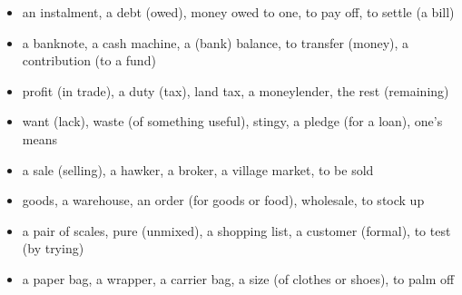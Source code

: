 \begin{itemize}
\raggedright
  \item an instalment, a debt (owed), money owed to one, to pay off, to settle (a bill)
  \item a banknote, a cash machine, a (bank) balance, to transfer (money), a contribution (to a fund)
  \item profit (in trade), a duty (tax), land tax, a moneylender, the rest (remaining)
  \item want (lack), waste (of something useful), stingy, a pledge (for a loan), one's means
  \item a sale (selling), a hawker, a broker, a village market, to be sold
  \item goods, a warehouse, an order (for goods or food), wholesale, to stock up
  \item a pair of scales, pure (unmixed), a shopping list, a customer (formal), to test (by trying)
  \item a paper bag, a wrapper, a carrier bag, a size (of clothes or shoes), to palm off
\end{itemize}

